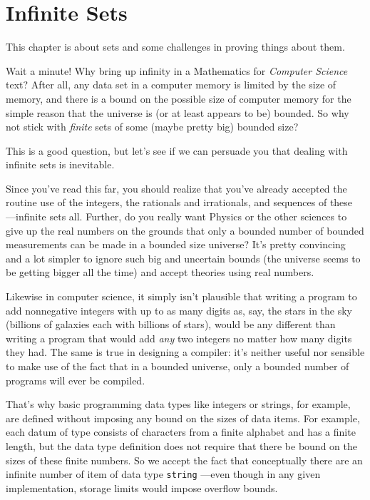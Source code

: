 \newcommand{\nsl}{\text{\small{NSL}}}
\newcommand{\asciistr}{\text{$\mathcal{S}$}}

\chapter{Infinite Sets}\label{infinite_chap}

This chapter is about  sets and some challenges in proving
things about them.

Wait a minute!  Why bring up infinity in a Mathematics for \emph{Computer
  Science} text?  \iffalse We've run into a lot of computer science
students who wonder why they should care about infinite sets.  They point
out that \fi
%
After all, any data set in a computer memory is limited by the size of
memory, and there is a bound on the possible size of computer memory for
the simple reason that the universe is (or at least appears to be)
bounded.  So why not stick with \emph{finite} sets of some (maybe pretty
big) bounded size?
%
\iffalse need to learn all this abstract theory of infinite sets, and this
is a good question.  \fi
%
This is a good question, but let's see if we can persuade you that dealing
with infinite sets is inevitable.

Since you've read this far, you should realize that you've already
accepted the routine use of the integers, the rationals and irrationals,
and sequences of these ---infinite sets all.  Further, do you really want
Physics or the other sciences to give up the real numbers on the grounds
that only a bounded number of bounded measurements can be made in a
bounded size universe?  It's pretty convincing and a lot simpler to ignore
such big and uncertain bounds (the universe seems to be getting bigger all the
time) and accept theories using real numbers.

Likewise in computer science, it simply isn't plausible that writing a
program to add nonnegative integers with up to as many digits as, say, the
stars in the sky (billions of galaxies each with billions of stars), would
be any different than writing a program that would add \emph{any} two
integers no matter how many digits they had.  The same is true in
designing a compiler: it's neither useful nor sensible to make use of the
fact that in a bounded universe, only a bounded number of programs will
ever be compiled.

\iffalse
That's why basic programming data types like integers or strings, for
example, are defined without imposing any bound on the sizes of data
items.  For example, each datum of type  consists of
characters from a finite alphabet and has a finite length, but the data
type definition does not require that there be bound on the sizes of these
finite numbers.  So we accept the fact that conceptually there are an
infinite number of item of data type \texttt{string} ---even though in any
given implementation, storage limits would impose overflow bounds.

